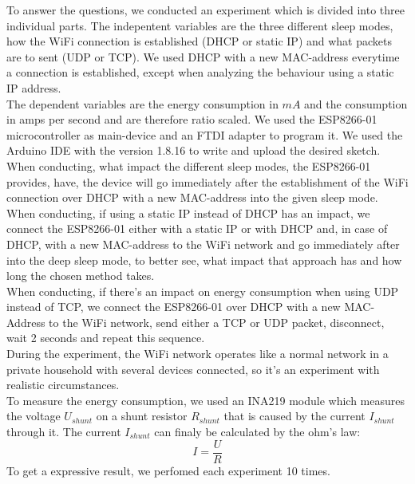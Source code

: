 To answer the questions, we conducted an experiment which is divided into three individual parts.
The indepentent variables are the three different sleep modes, how the WiFi connection is established (DHCP or static IP) and what packets are to sent (UDP or TCP).
We used DHCP with a new MAC-address everytime a connection is established, except when analyzing the behaviour using a static IP address.\\
The dependent variables are the energy consumption in $mA$ and the consumption in amps per second and are therefore ratio scaled.
We used the ESP8266-01 microcontroller as main-device and an FTDI adapter to program it. We used the Arduino IDE with the version 1.8.16 to write and upload the desired sketch.\\
When conducting, what impact the different sleep modes, the ESP8266-01 provides, have, the device will go immediately after the establishment of the WiFi connection over DHCP with a new MAC-address into the given sleep mode.\\
When conducting, if using a static IP instead of DHCP has an impact, we connect the ESP8266-01 either with a static IP or with DHCP and, in case of DHCP, with a new MAC-address to the WiFi network and go immediately after into the deep sleep mode, to better see, what impact that approach has and how long the chosen method takes.\\
When conducting, if there's an impact on energy consumption when using UDP instead of TCP, we connect the ESP8266-01 over DHCP with a new MAC-Address to the WiFi network, send either a TCP or UDP packet, disconnect, wait 2 seconds and repeat this sequence.\\
During the experiment, the WiFi network operates like a normal network in a private household with several devices connected, so it's an experiment with realistic circumstances.\\

To measure the energy consumption, we used an INA219 module which measures the voltage $U_{shunt}$ on a shunt resistor $R_{shunt}$ that is caused by the current $I_{shunt}$ through it.
The current $I_{shunt}$ can finaly be calculated by the ohm's law:
\begin{equation*}
    I = \frac{U}{R}
\end{equation*}
To get a expressive result, we perfomed each experiment 10 times.





